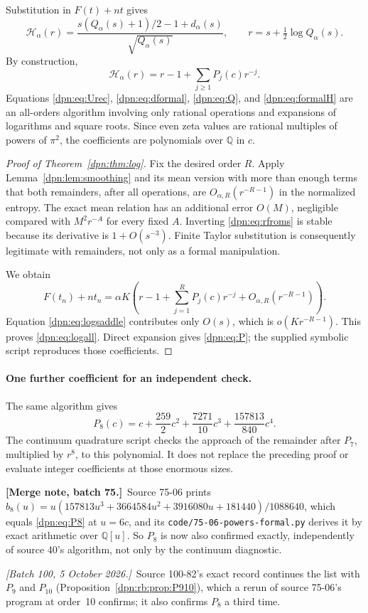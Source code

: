 \documentclass[11pt]{article}
\numberwithin{equation}{section}
\theoremstyle{definition}\newtheorem{definition}[theorem]{Definition}
\theoremstyle{remark}\newtheorem{remark}[theorem]{Remark}
\newcommand{\asym}{\mathscr H_{\alpha}}
\newcommand{\file}[1]{\nolinkurl{#1}}
\newcommand{\mergenoteb}[1]{\par\smallskip\noindent\textbf{[Merge note, batch 75.]}\ #1\par\smallskip}
\newcommand{\writenoted}[1]{\par\smallskip\noindent\textit{[Batch 100, 5 October 2026.]}\ #1\par\smallskip}
\begin{document}
Substitution in $F(t)+nt$ gives
\begin{equation}\label{dpn:eq:formalH}
 \asym(r)=
 \frac{s(Q_\alpha(s)+1)/2-1+d_\alpha(s)}{\sqrt{Q_\alpha(s)}},
 \qquad r=s+\tfrac12\log Q_\alpha(s).
\end{equation}
By construction,
\begin{equation}\label{dpn:eq:Hseries}
 \asym(r)=r-1+\sum_{j\ge1}P_j(c)r^{-j}.
\end{equation}
Equations \eqref{dpn:eq:Urec}, \eqref{dpn:eq:dformal}, \eqref{dpn:eq:Q}, and
\eqref{dpn:eq:formalH} are an all-orders algorithm involving only rational
operations and expansions of logarithms and square roots. Since even zeta
values are rational multiples of powers of $\pi^2$, the coefficients are
polynomials over $\mathbb Q$ in $c$.

\begin{proof}[Proof of Theorem~\ref{dpn:thm:log}]
Fix the desired order $R$. Apply Lemma~\ref{dpn:lem:smoothing} and its mean
version with more than enough terms that both remainders, after all
operations, are $O_{\alpha,R}(r^{-R-1})$ in the normalized entropy.
The exact mean relation has an additional error $O(M)$, negligible compared
with $M^2r^{-A}$ for every fixed $A$. Inverting
\eqref{dpn:eq:rfroms} is stable because its derivative is $1+O(s^{-3})$.
Finite Taylor substitution is consequently legitimate with remainders, not
only as a formal manipulation.

We obtain
\[
 F(t_n)+nt_n=\alpha K\left(r-1+\sum_{j=1}^R P_j(c)r^{-j}
                         +O_{\alpha,R}(r^{-R-1})\right).
\]
Equation \eqref{dpn:eq:logsaddle} contributes only $O(s)$, which is
$o(Kr^{-R-1})$. This proves \eqref{dpn:eq:logall}. Direct expansion gives
\eqref{dpn:eq:P}; the supplied symbolic script reproduces those coefficients.
\end{proof}

\paragraph{One further coefficient for an independent check.}
The same algorithm gives
\begin{equation}\label{dpn:eq:P8}
 P_8(c)=c+\frac{259}2c^2+\frac{7271}{10}c^3
                  +\frac{157813}{840}c^4.
\end{equation}
The continuum quadrature script checks the approach of the remainder after
$P_7$, multiplied by $r^8$, to this polynomial. It does not replace the
preceding proof or evaluate integer coefficients at those enormous sizes.
\mergenoteb{Source 75-06 prints
$b_8(u)=u(157813u^3+3664584u^2+3916080u+181440)/1088640$, which equals
\eqref{dpn:eq:P8} at $u=6c$, and its \file{code/75-06-powers-formal.py}
derives it by exact arithmetic over $\mathbb Q[u]$.  So $P_8$ is now also
confirmed exactly, independently of source 40's algorithm, not only by the
continuum diagnostic.}
\writenoted{Source 100-82's exact record continues the list with $P_9$ and
$P_{10}$ (Proposition~\ref{dpn:rb:prop:P910}), which a rerun of source 75-06's
program at order~10 confirms; it also confirms $P_8$ a third time.}
\end{document}
